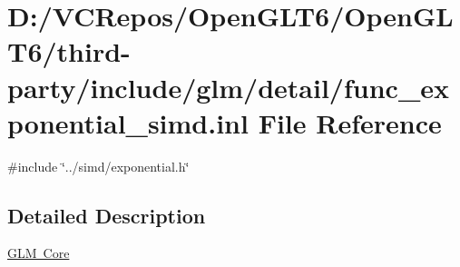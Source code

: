 \hypertarget{func__exponential__simd_8inl}{}\section{D\+:/\+V\+C\+Repos/\+Open\+G\+L\+T6/\+Open\+G\+L\+T6/third-\/party/include/glm/detail/func\+\_\+exponential\+\_\+simd.inl File Reference}
\label{func__exponential__simd_8inl}
{\ttfamily \#include \char`\"{}../simd/exponential.\+h\char`\"{}}\newline


\subsection{Detailed Description}
\mbox{\hyperlink{group__core}{G\+LM Core}} 